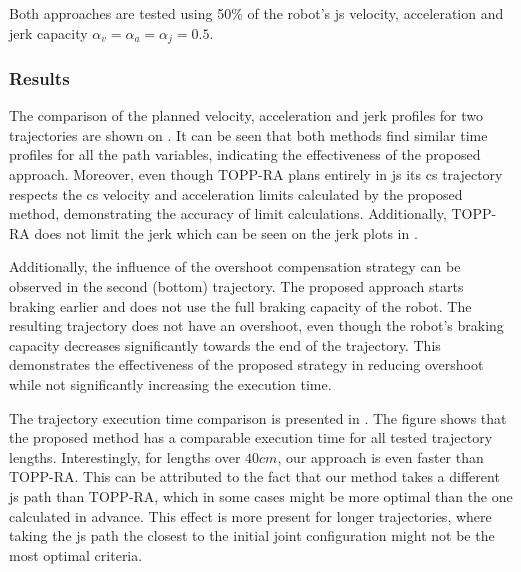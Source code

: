 Both approaches are tested using 50\% of the robot's \gls{js} velocity, acceleration and jerk capacity $\alpha_v\!=\!\alpha_a\!=\!\alpha_j = 0.5$. 



\subsubsection*{Results} The comparison of the planned velocity, acceleration and jerk profiles for two trajectories are shown on . It can be seen that both methods find similar time profiles for all the path variables, indicating the effectiveness of the proposed approach. Moreover, even though TOPP-RA plans entirely in \gls{js} its \gls{cs} trajectory respects the \gls{cs} velocity and acceleration limits calculated by the proposed method, demonstrating the accuracy of limit calculations. Additionally, TOPP-RA does not limit the jerk which can be seen on the jerk plots in .

Additionally, the influence of the overshoot compensation strategy can be observed in the second (bottom) trajectory. The proposed approach starts braking earlier and does not use the full braking capacity of the robot. The resulting trajectory does not have an overshoot, even though the robot's braking capacity decreases significantly towards the end of the trajectory. This demonstrates the effectiveness of the proposed strategy in reducing overshoot while not significantly increasing the execution time.

The trajectory execution time comparison is presented in . The figure shows that the proposed method has a comparable execution time for all tested trajectory lengths. Interestingly, for lengths over $40cm$, our approach is even faster than TOPP-RA. This can be attributed to the fact that our method takes a different \gls{js} path than TOPP-RA, which in some cases might be more optimal than the one calculated in advance. 
This effect is more present for longer trajectories, where taking the \gls{js} path the closest to the initial joint configuration might not be the most optimal criteria. 


